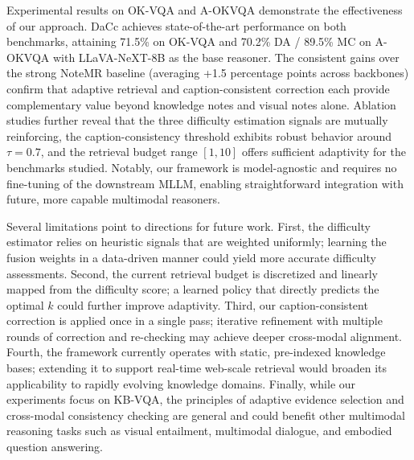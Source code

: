 \documentclass[manuscript,screen,review]{acmart}
\begin{document}
Experimental results on OK-VQA and A-OKVQA demonstrate the effectiveness of our approach. DaCc achieves state-of-the-art performance on both benchmarks, attaining 71.5\% on OK-VQA and 70.2\% DA / 89.5\% MC on A-OKVQA with LLaVA-NeXT-8B as the base reasoner. The consistent gains over the strong NoteMR baseline (averaging +1.5 percentage points across backbones) confirm that adaptive retrieval and caption-consistent correction each provide complementary value beyond knowledge notes and visual notes alone. Ablation studies further reveal that the three difficulty estimation signals are mutually reinforcing, the caption-consistency threshold exhibits robust behavior around $\tau=0.7$, and the retrieval budget range $[1,10]$ offers sufficient adaptivity for the benchmarks studied. Notably, our framework is model-agnostic and requires no fine-tuning of the downstream MLLM, enabling straightforward integration with future, more capable multimodal reasoners.

Several limitations point to directions for future work. First, the difficulty estimator relies on heuristic signals that are weighted uniformly; learning the fusion weights in a data-driven manner could yield more accurate difficulty assessments. Second, the current retrieval budget is discretized and linearly mapped from the difficulty score; a learned policy that directly predicts the optimal $k$ could further improve adaptivity. Third, our caption-consistent correction is applied once in a single pass; iterative refinement with multiple rounds of correction and re-checking may achieve deeper cross-modal alignment. Fourth, the framework currently operates with static, pre-indexed knowledge bases; extending it to support real-time web-scale retrieval would broaden its applicability to rapidly evolving knowledge domains. Finally, while our experiments focus on KB-VQA, the principles of adaptive evidence selection and cross-modal consistency checking are general and could benefit other multimodal reasoning tasks such as visual entailment, multimodal dialogue, and embodied question answering.


\end{document}
